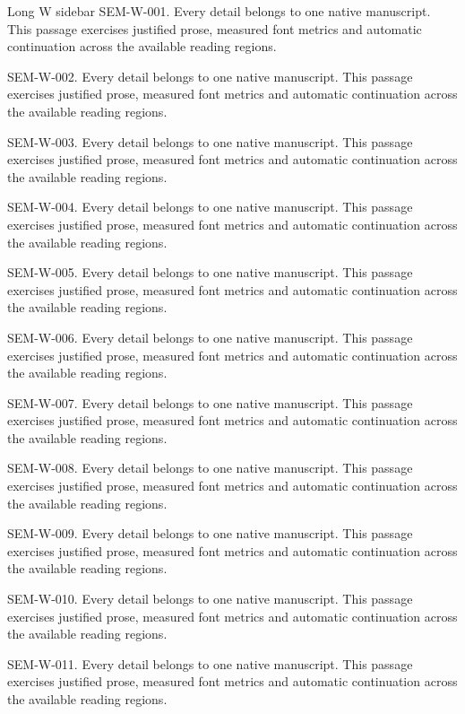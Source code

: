 \begin{m20sidebarwide}[columns=1,id=long-wide1]{Long W sidebar}
SEM-W-001. Every detail belongs to one native manuscript. This passage exercises justified prose, measured font metrics and automatic continuation across the available reading regions.\par
SEM-W-002. Every detail belongs to one native manuscript. This passage exercises justified prose, measured font metrics and automatic continuation across the available reading regions.\par
SEM-W-003. Every detail belongs to one native manuscript. This passage exercises justified prose, measured font metrics and automatic continuation across the available reading regions.\par
SEM-W-004. Every detail belongs to one native manuscript. This passage exercises justified prose, measured font metrics and automatic continuation across the available reading regions.\par
SEM-W-005. Every detail belongs to one native manuscript. This passage exercises justified prose, measured font metrics and automatic continuation across the available reading regions.\par
SEM-W-006. Every detail belongs to one native manuscript. This passage exercises justified prose, measured font metrics and automatic continuation across the available reading regions.\par
SEM-W-007. Every detail belongs to one native manuscript. This passage exercises justified prose, measured font metrics and automatic continuation across the available reading regions.\par
SEM-W-008. Every detail belongs to one native manuscript. This passage exercises justified prose, measured font metrics and automatic continuation across the available reading regions.\par
SEM-W-009. Every detail belongs to one native manuscript. This passage exercises justified prose, measured font metrics and automatic continuation across the available reading regions.\par
SEM-W-010. Every detail belongs to one native manuscript. This passage exercises justified prose, measured font metrics and automatic continuation across the available reading regions.\par
SEM-W-011. Every detail belongs to one native manuscript. This passage exercises justified prose, measured font metrics and automatic continuation across the available reading regions.\par

\end{m20sidebarwide}
